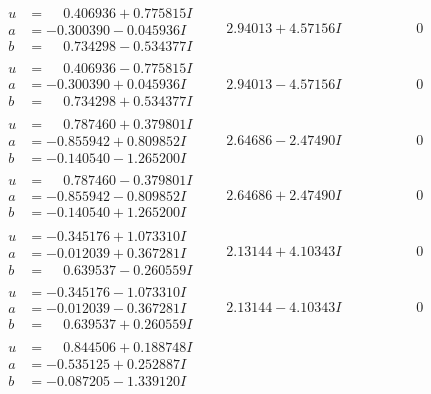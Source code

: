 \documentclass[1p]{elsarticle_modified}
\theoremstyle{definition}
\begin{document}
$$\begin{array}{c|c|c}
\begin{aligned}
u &= \phantom{-}0.406936 + 0.775815 I \\
a &= -0.300390 - 0.045936 I \\
b &= \phantom{-}0.734298 - 0.534377 I\end{aligned}
 & \phantom{-}2.94013 + 4.57156 I & \phantom{-0.000000 } 0 \\ \hline\begin{aligned}
u &= \phantom{-}0.406936 - 0.775815 I \\
a &= -0.300390 + 0.045936 I \\
b &= \phantom{-}0.734298 + 0.534377 I\end{aligned}
 & \phantom{-}2.94013 - 4.57156 I & \phantom{-0.000000 } 0 \\ \hline\begin{aligned}
u &= \phantom{-}0.787460 + 0.379801 I \\
a &= -0.855942 + 0.809852 I \\
b &= -0.140540 - 1.265200 I\end{aligned}
 & \phantom{-}2.64686 - 2.47490 I & \phantom{-0.000000 } 0 \\ \hline\begin{aligned}
u &= \phantom{-}0.787460 - 0.379801 I \\
a &= -0.855942 - 0.809852 I \\
b &= -0.140540 + 1.265200 I\end{aligned}
 & \phantom{-}2.64686 + 2.47490 I & \phantom{-0.000000 } 0 \\ \hline\begin{aligned}
u &= -0.345176 + 1.073310 I \\
a &= -0.012039 + 0.367281 I \\
b &= \phantom{-}0.639537 - 0.260559 I\end{aligned}
 & \phantom{-}2.13144 + 4.10343 I & \phantom{-0.000000 } 0 \\ \hline\begin{aligned}
u &= -0.345176 - 1.073310 I \\
a &= -0.012039 - 0.367281 I \\
b &= \phantom{-}0.639537 + 0.260559 I\end{aligned}
 & \phantom{-}2.13144 - 4.10343 I & \phantom{-0.000000 } 0 \\ \hline\begin{aligned}
u &= \phantom{-}0.844506 + 0.188748 I \\
a &= -0.535125 + 0.252887 I \\
b &= -0.087205 - 1.339120 I\end{aligned}

\end{array}$$
\end{document}
